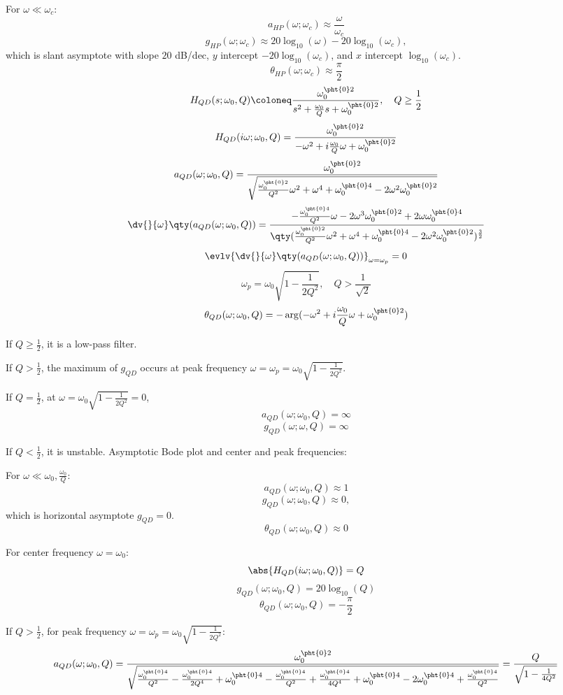 \documentclass[a4paper,12pt]{report}
\begin{document}
\item For $\omega\ll \omega_c$:
\[a_{HP}(\omega;\omega_c)\approx\frac{\omega}{\omega_c}\]
\[g_{HP}(\omega;\omega_c)\approx 20\log_{10}(\omega)-20\log_{10}(\omega_c),\]
which is slant asymptote with slope $20$ dB/dec, $y$ intercept $-20\log_{10}(\omega_c)$, and $x$ intercept $\log_{10}(\omega_c)$.
\[\theta_{HP}(\omega;\omega_c)\approx\frac{\pi}{2}\]
\eit
{}
\[H_{QD}(s;\omega_0,Q)\coloneq\frac{\omega_0^{\pht{0}2}}{s^2+\frac{\omega_0}{Q}s+\omega_0^{\pht{0}2}},\quad Q\ge\frac{1}{2}\]
\[H_{QD}(i\omega;\omega_0,Q)=\frac{\omega_0^{\pht{0}2}}{-\omega^2+i\frac{\omega_0}{Q}\omega+\omega_0^{\pht{0}2}}\]
\[a_{QD}(\omega;\omega_0,Q)=\frac{\omega_0^{\pht{0}2}}{\sqrt{\frac{\omega_0^{\pht{0}2}}{Q^2}\omega^2+\omega^4+\omega_0^{\pht{0}4}-2\omega^2\omega_0^{\pht{0}2}}}\]
\[\dv{}{\omega}\qty(a_{QD}(\omega;\omega_0,Q))=\frac{-\frac{\omega_0^{\pht{0}4}}{Q^2}\omega-2\omega^3\omega_0^{\pht{0}2}+2\omega\omega_0^{\pht{0}4}}{\qty(\frac{\omega_0^{\pht{0}2}}{Q^2}\omega^2+\omega^4+\omega_0^{\pht{0}4}-2\omega^2\omega_0^{\pht{0}2})^{\frac{3}{2}}}\]
\[\evlv{\dv{}{\omega}\qty(a_{QD}(\omega;\omega_0,Q))}_{\omega=\omega_p}=0\]
\[\omega_p=\omega_0\sqrt{1-\frac{1}{2Q^2}},\quad Q>\frac{1}{\sqrt{2}}\]
\[\theta_{QD}(\omega;\omega_0,Q)=-\arg(-\omega^2+i\frac{\omega_0}{Q}\omega+\omega_0^{\pht{0}2})\]
\bit
\item If $Q\ge\frac{1}{2}$, it is a low-pass filter.
\item If $Q>\frac{1}{2}$, the maximum of $g_{QD}$ occurs at peak frequency $\omega=\omega_p=\omega_0\sqrt{1-\frac{1}{2Q^2}}$.
\item If $Q=\frac{1}{2}$, at $\omega=\omega_0\sqrt{1-\frac{1}{2Q^2}}=0$,
\[a_{QD}(\omega;\omega_0,Q)=\infty\]
\[g_{QD}(\omega;\omega,Q)=\infty\]
\item If $Q<\frac{1}{2}$, it is unstable.
\eit
Asymptotic Bode plot and center and peak frequencies:
\bit
\item For $\omega\ll\omega_0,\frac{\omega_0}{Q}$:
\[a_{QD}(\omega;\omega_0,Q)\approx1\]
\[g_{QD}(\omega;\omega_0,Q)\approx0,\]
which is horizontal asymptote $g_{QD}=0$.
\[\theta_{QD}(\omega;\omega_0,Q)\approx0\]
\item For center frequency $\omega=\omega_0$:
\[\abs{H_{QD}(i\omega;\omega_0,Q)}=Q\]
\[g_{QD}(\omega;\omega_0,Q)=20\log_{10}(Q)\]
\[\theta_{QD}(\omega;\omega_0,Q)=-\frac{\pi}{2}\]
\item If $Q>\frac{1}{2}$, for peak frequency $\omega=\omega_p=\omega_0\sqrt{1-\frac{1}{2Q^2}}$:
\[a_{QD}(\omega;\omega_0,Q)=\frac{\omega_0^{\pht{0}2}}{\sqrt{\frac{\omega_0^{\pht{0}4}}{Q^2}-\frac{\omega_0^{\pht{0}4}}{2Q^4}+\omega_0^{\pht{0}4}-\frac{\omega_0^{\pht{0}4}}{Q^2}+\frac{\omega_0^{\pht{0}4}}{4Q^4}+\omega_0^{\pht{0}4}-2\omega_0^{\pht{0}4}+\frac{\omega_0^{\pht{0}4}}{Q^2}}}=\frac{Q}{\sqrt{1-\frac{1}{4Q^2}}}\]
\end{document}
